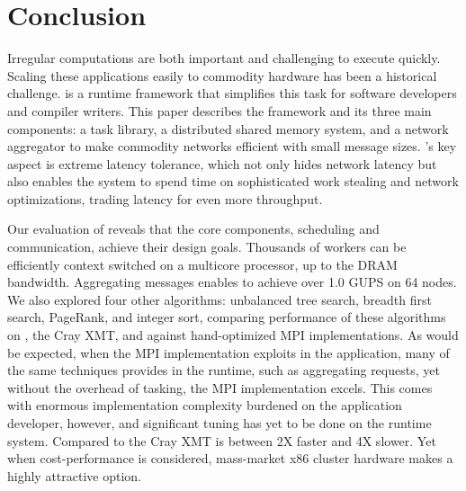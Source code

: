 \section{Conclusion}

Irregular computations are both important and challenging to execute quickly.
Scaling these applications easily to commodity hardware has been a historical
challenge. \Grappa is a runtime framework that simplifies this task for
software developers and compiler writers. This paper describes the \Grappa
framework and its three main components: a task library, a distributed shared
memory system, and a network aggregator to make commodity networks efficient
with small message sizes. \Grappa's key aspect is extreme latency tolerance,
which not only hides network latency but also enables the system to spend time
on sophisticated work stealing and network optimizations, trading latency for
even more throughput.

Our evaluation of \Grappa reveals that the core components, scheduling and communication, achieve their design goals.  Thousands of workers can be efficiently context switched on a multicore processor, up to the DRAM bandwidth.  Aggregating messages enables \Grappa to achieve over 1.0 GUPS on 64 nodes.  We also explored four other algorithms: unbalanced tree search, breadth first search, PageRank, and integer sort, comparing performance of these algorithms on \Grappa, the Cray XMT, and against hand-optimized MPI implementations.  As would be expected, when the MPI implementation exploits in the application, many of the same techniques \Grappa provides in the runtime, such as aggregating requests, yet without the overhead of tasking, the MPI implementation excels.  This comes with enormous implementation complexity burdened on the application developer, however, and significant tuning has yet to be done on the \Grappa runtime system.  Compared to the Cray XMT \Grappa is between 2X faster and 4X slower.  Yet when cost-performance is considered, mass-market x86 cluster hardware makes \Grappa a highly attractive option.
